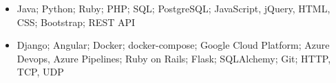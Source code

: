\begin{cvsubsection}{}{}{}	
	\begin{itemize}
		\item Java; Python; Ruby; PHP; SQL; PostgreSQL; JavaScript, jQuery, HTML, CSS; Bootstrap; REST API
		\item Django; Angular; Docker; docker-compose; Google Cloud Platform; Azure Devops, Azure Pipelines; Ruby on Rails; Flask; SQLAlchemy; Git; HTTP, TCP, UDP
	\end{itemize}
\end{cvsubsection}